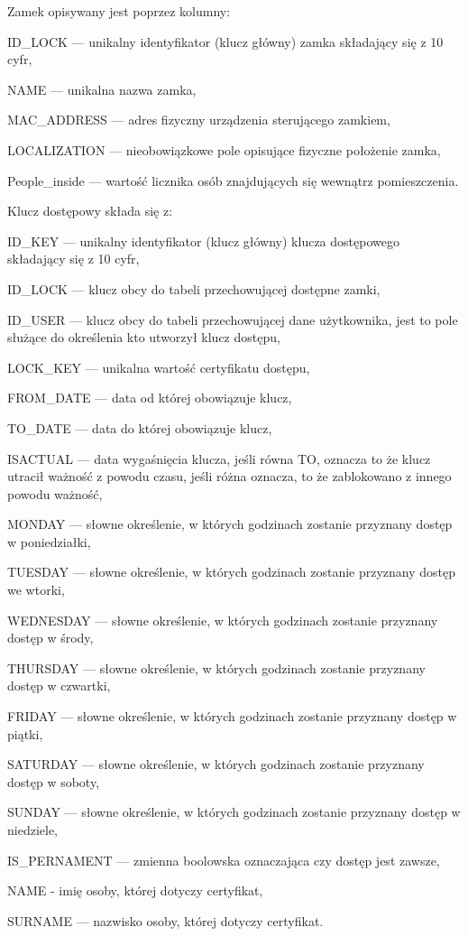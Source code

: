 	Zamek opisywany jest poprzez kolumny:
	\begin{itemize*}
		\item {ID\_LOCK} --- unikalny identyfikator (klucz główny) zamka składający się z 10 cyfr,
		\item {NAME} --- unikalna nazwa zamka,
		\item {MAC\_ADDRESS} --- adres fizyczny urządzenia sterującego zamkiem,
		\item {LOCALIZATION} --- nieobowiązkowe pole opisujące fizyczne położenie zamka,
		\item {People\_inside} --- wartość licznika osób znajdujących się wewnątrz pomieszczenia.
	\end{itemize*}
	\newpage
	
	Klucz dostępowy składa się z:
	\begin{itemize*}
		\item {ID\_KEY} --- unikalny identyfikator (klucz główny) klucza dostępowego składający się z 10 cyfr,
		\item {ID\_LOCK} --- klucz obcy do tabeli przechowującej dostępne zamki,
		\item {ID\_USER} --- klucz obcy do tabeli przechowującej dane użytkownika, jest to pole służące do określenia kto utworzył klucz dostępu,
		\item {LOCK\_KEY} --- unikalna wartość certyfikatu dostępu,
		\item {FROM\_DATE} --- data od której obowiązuje klucz,
		\item {TO\_DATE} --- data do której obowiązuje klucz,
		\item {ISACTUAL} --- data wygaśnięcia klucza, jeśli równa TO, oznacza to że klucz utracił ważność z powodu czasu, jeśli różna oznacza, to że zablokowano z innego powodu ważność,
		\item {MONDAY} --- słowne określenie, w których godzinach zostanie przyznany dostęp w poniedziałki,
		\item {TUESDAY} --- słowne określenie, w których godzinach zostanie przyznany dostęp we wtorki,
		\item {WEDNESDAY} --- słowne określenie, w których godzinach zostanie przyznany dostęp w środy,
		\item {THURSDAY} --- słowne określenie, w których godzinach zostanie przyznany dostęp w czwartki,
		\item {FRIDAY} --- słowne określenie, w których godzinach zostanie przyznany dostęp w piątki,
		\item {SATURDAY} --- słowne określenie, w których godzinach zostanie przyznany dostęp w soboty,
		\item {SUNDAY} --- słowne określenie, w których godzinach zostanie przyznany dostęp w niedziele,
		\item {IS\_PERNAMENT} --- zmienna boolowska oznaczająca czy dostęp jest zawsze,
		\item {NAME} - imię osoby, której dotyczy certyfikat,
		\item {SURNAME} --- nazwisko osoby, której dotyczy certyfikat.
	\end{itemize*}
	
